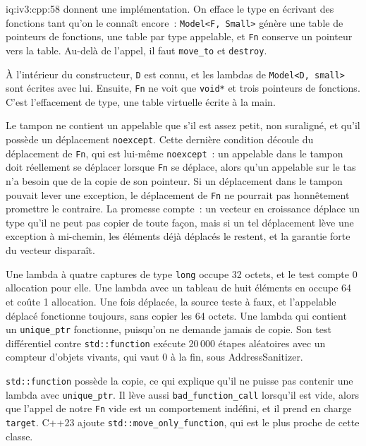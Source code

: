 \begin{solution}{iq:iv3:cpp:58}
 donnent une implémentation. On efface le type en écrivant des fonctions tant qu'on le connaît encore~: \texttt{Model<F, Small>} génère une table de pointeurs de fonctions, une table par type appelable, et \texttt{Fn} conserve un pointeur vers la table. Au-delà de l'appel, il faut \texttt{move\_to} et \texttt{destroy}.
\label{lst:iv3:cp:fn1}
\enlargethispage{-3\baselineskip}%
\label{lst:iv3:cp:fn2}

À l'intérieur du constructeur, \texttt{D} est connu, et les lambdas de \texttt{Model<D, small>} sont écrites avec lui. Ensuite, \texttt{Fn} ne voit que \texttt{void*} et trois pointeurs de fonctions. C'est l'effacement de type, une table virtuelle écrite à la main.

Le tampon ne contient un appelable que s'il est assez petit, non suraligné, et qu'il possède un déplacement \texttt{noexcept}. Cette dernière condition découle du déplacement de \texttt{Fn}, qui est lui-même \texttt{noexcept}~: un appelable dans le tampon doit réellement se déplacer lorsque \texttt{Fn} se déplace, alors qu'un appelable sur le tas n'a besoin que de la copie de son pointeur. Si un déplacement dans le tampon pouvait lever une exception, le déplacement de \texttt{Fn} ne pourrait pas honnêtement promettre le contraire. La promesse compte~: un vecteur en croissance déplace un type qu'il ne peut pas copier de toute façon, mais si un tel déplacement lève une exception à mi-chemin, les éléments déjà déplacés le restent, et la garantie forte du vecteur disparaît.

Une lambda à quatre captures de type \texttt{long} occupe 32 octets, et le test compte 0 allocation pour elle. Une lambda avec un tableau de huit éléments en occupe 64 et coûte 1 allocation. Une fois déplacée, la source teste à faux, et l'appelable déplacé fonctionne toujours, sans copier les 64 octets. Une lambda qui contient un \texttt{unique\_ptr} fonctionne, puisqu'on ne demande jamais de copie. Son test différentiel contre \texttt{std::function} exécute 20\,000 étapes aléatoires avec un compteur d'objets vivants, qui vaut 0 à la fin, sous AddressSanitizer.

\texttt{std::function} possède la copie, ce qui explique qu'il ne puisse pas contenir une lambda avec \texttt{unique\_ptr}. Il lève aussi \texttt{bad\_function\_call} lorsqu'il est vide, alors que l'appel de notre \texttt{Fn} vide est un comportement indéfini, et il prend en charge \texttt{target}. C++23 ajoute \texttt{std::move\_only\_function}, qui est le plus proche de cette classe.

\end{solution}


